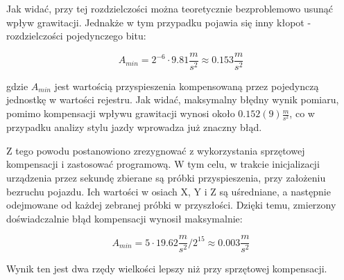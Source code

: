 Jak widać, przy tej rozdzielczości można teoretycznie bezproblemowo usunąć wpływ grawitacji. Jednakże w tym przypadku pojawia się inny kłopot - rozdzielczości pojedynczego bitu:

\begin{equation}
A_{min} = 2^{-6} \cdot 9.81\frac{m}{s^2} \approx 0.153 \frac{m}{s^2}
\end{equation}

gdzie $A_{min}$ jest wartością przyspieszenia kompensowaną przez pojedynczą jednostkę w wartości rejestru. Jak widać, maksymalny błędny wynik pomiaru, pomimo kompensacji wpływu grawitacji wynosi około $0.152(9) \frac{m}{s^2}$, co w przypadku analizy stylu jazdy wprowadza już znaczny błąd. 

Z tego powodu postanowiono zrezygnować z wykorzystania sprzętowej kompensacji i zastosować programową. W tym celu, w trakcie inicjalizacji urządzenia przez sekundę zbierane są próbki przyspieszenia, przy założeniu bezruchu pojazdu. Ich wartości w osiach X, Y i Z są uśredniane, a następnie odejmowane od każdej zebranej próbki w przyszłości. Dzięki temu, zmierzony doświadczalnie błąd kompensacji wynosił maksymalnie:

 \begin{equation}
A_{min} = 5 \cdot 19.62\frac{m}{s^2}/{2^{15}} \approx 0.003 \frac{m}{s^2}
\end{equation}

Wynik ten jest dwa rzędy wielkości lepszy niż przy sprzętowej kompensacji.
